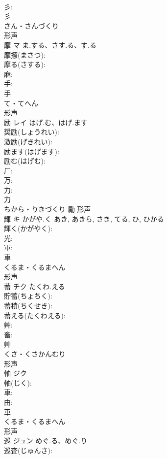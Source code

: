\documentclass[8pt]{extreport}
\begin{document}
\begin{CJK}{UTF8}{min}
\\	彡: 
\\	彡	
\\	さん・さんづくり	
\\	形声 
\\	摩	マ	ま.する、さす.る、す.る		
\\	摩擦(まさつ): 
\\	摩る(さする): 
\\	麻: 
\\	手: 
\\	手	
\\	て・てへん	
\\	形声 
\\	励	レイ	はげ.む、はげ.ます		
\\	奨励(しょうれい): 
\\	激励(げきれい): 
\\	励ます(はげます): 
\\	励む(はげむ): 
\\	厂: 
\\	万: 
\\	力: 
\\	力	
\\	ちから・りきづくり	勵	形声 
\\	輝	キ	かがや.く	あき, あきら, さき, てる, ひ, ひかる	
\\	輝く(かがやく): 
\\	光: 
\\	軍: 
\\	車	
\\	くるま・くるまへん	
\\	形声 
\\	蓄	チク	たくわ.える		
\\	貯蓄(ちょちく): 
\\	蓄積(ちくせき): 
\\	蓄える(たくわえる): 
\\	艸: 
\\	畜: 
\\	艸	
\\	くさ・くさかんむり	
\\	形声 
\\	軸	ジク			
\\	軸(じく): 
\\	車: 
\\	由: 
\\	車	
\\	くるま・くるまへん	
\\	形声 
\\	巡	ジュン	めぐ.る、めぐ.り		
\\	巡査(じゅんさ): 

\end{CJK}
\end{document}
